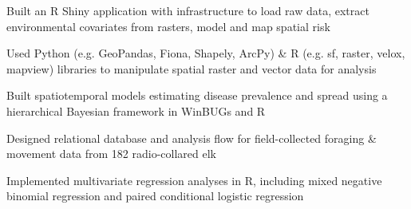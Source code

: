 \documentclass[]{deedy-resume-openfont}
\begin{document}
\begin{minipage}[t]{0.66\textwidth}
\location{} %
\begin{tightemize}
\item Built an R Shiny application with infrastructure to load raw data, extract environmental covariates from rasters, model and map spatial risk  \href{https://fw-habitat-aep.shinyapps.io/ABCWD_Shiny/}{\faGlobe} \href{https://github.com/dpseidel/ABCWD_Shiny}{\faGithub}
\item Used Python (e.g. GeoPandas, Fiona, Shapely, ArcPy) \& R (e.g. sf, raster, velox, mapview) libraries to manipulate spatial raster and vector data for analysis
\item Built spatiotemporal models estimating disease prevalence and spread using a hierarchical Bayesian framework in WinBUGs and R
\end{tightemize}

\location{} %
\begin{tightemize}
\item Designed relational database and analysis flow for field-collected foraging \& movement data from 182 radio-collared elk
\item Implemented multivariate regression analyses in R, including mixed negative binomial regression and paired conditional logistic regression 
\end{tightemize}
\sectionsep


\end{minipage}
\end{document}
